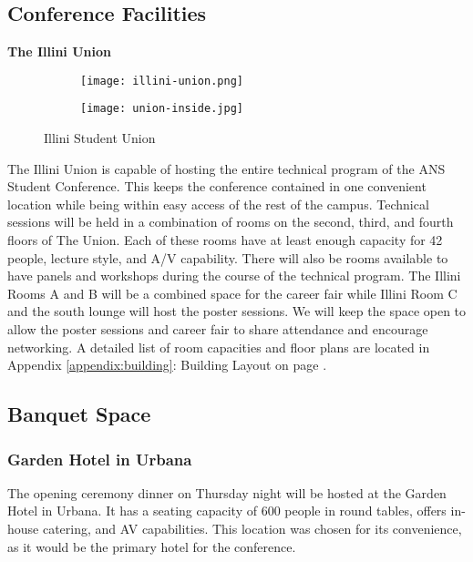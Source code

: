 \subsection{Conference Facilities}

\textbf{The Illini Union}\\

\begin{figure}[H]
	\centering
	\begin{subfigure}{0.5\textwidth}
		\centering
		\texttt{[image: illini-union.png]}
	\end{subfigure}%
	\begin{subfigure}{0.5\textwidth}
		\centering
		\texttt{[image: union-inside.jpg]}
	\end{subfigure}
	\caption{Illini Student Union}		
\end{figure} 


The Illini Union is capable of hosting the entire technical program of the ANS 
Student Conference. This keeps the conference contained in one convenient 
location while being within easy access of the rest of the campus. Technical 
sessions will be held in a combination of rooms on the second, third, and 
fourth floors of The Union. Each of these rooms have at least enough capacity 
for 42 people, lecture style, and A/V capability. There will also be rooms 
available to have panels and workshops during the course of the technical 
program. The Illini Rooms A and B will be a combined space for the career fair 
while Illini Room C and the south lounge will host the poster sessions. We will 
keep the space open to allow the poster sessions and career fair to share 
attendance and encourage networking. A detailed list of room capacities and 
floor plans are located in Appendix \ref{appendix:building}: Building Layout on 
page \pageref{appendix:building}. \\


\subsection{Banquet Space}
\subsubsection{Garden Hotel in Urbana}
The opening ceremony dinner on Thursday night will be hosted at the Garden Hotel in Urbana. It has a seating capacity of 600 people in round tables, offers in-house catering, and AV capabilities. This location was chosen for its convenience, as it would be the primary hotel for the conference. 

